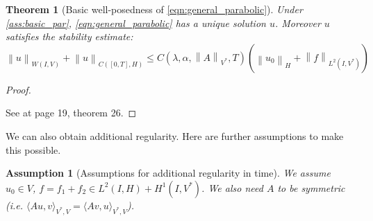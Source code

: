 \documentclass[english,a4paper,9pt,oneside]{scrbook}	%
\theoremstyle{break}
\newtheorem{thm}[equation]{Theorem}
\newtheorem{ass}[equation]{Assumption}
\newenvironment{mproof}[1][\proofname]{%
  \begin{proof}[#1]$ $\par\nobreak\ignorespaces
}{%
  \end{proof}
}
\renewcommand*{\proofname}{Proof}
\theoremstyle{remark}
\newcommand{\norm}[1]{\left\lVert#1\right\rVert}
\newcommand{\HN}[1]{\norm{#1}_{H}}
\newcommand{\VN}[1]{\norm{#1}_{V}}
\newcommand{\VSN}[1]{\norm{#1}_{V^*}}
\begin{document}
\begin{appendices}
\begin{thm}[Basic well-posedness of \cref{eqn:general_parabolic}]
\label{thm:well_pos_parabolic}
Under \cref{ass:basic_par}, \cref{eqn:general_parabolic} has a unique solution $u$. Moreover $u$ satisfies the stability estimate:
\begin{equation}
	\label{eqn:en_est}
	\norm{u}_{W(I,V)} + \norm{u}_{C([0,T],H)}\leq C(\lambda, \alpha, \VSN{A}, T)(\HN{u_0}+\norm{f}_{L^2(I,V^*)})
\end{equation} 
\end{thm}
\begin{mproof}
See \cite{gilardi} at page 19, theorem 26.
\end{mproof}

We can also obtain additional regularity. Here are further assumptions to make this possible.

\begin{ass}[Assumptions for additional regularity in time]
\label{ass:reg_par}
We assume $u_0 \in V$, $f = f_1+f_2 \in L^2(I,H)+H^1(I,V^*)$. We also need $A$ to be symmetric (i.e. $\langle Au,v \rangle_{V^*,V} = \langle Av,u \rangle_{V^*,V}$).
\end{ass}

%
% 
%
%


\end{appendices}
\end{document}

